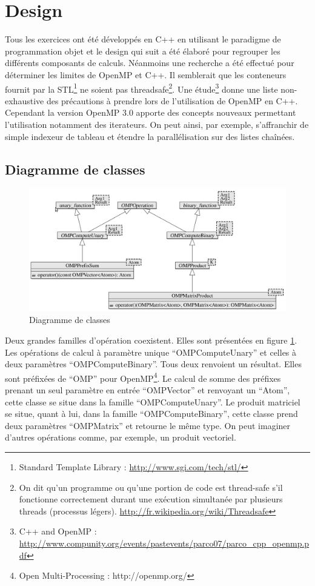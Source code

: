 \section{Design}

Tous les exercices ont été développés en C++ en utilisant le paradigme de programmation objet et le design qui suit a été élaboré pour regrouper les différents composants de calculs. Néanmoins une recherche a été effectué pour déterminer les limites de OpenMP et C++. Il semblerait que les conteneurs fournit par la STL\footnote{Standard Template Library : \url{http://www.sgi.com/tech/stl/}} ne soient pas threadsafe\footnote{On dit qu’un programme ou qu'une portion de code est thread-safe s'il fonctionne correctement durant une exécution simultanée par plusieurs threads (processus légers). \url{http://fr.wikipedia.org/wiki/Threadsafe}}. Une étude\footnote{C++ and OpenMP : \url{http://www.compunity.org/events/pastevents/parco07/parco_cpp_openmp.pdf}} donne une liste non-exhaustive des précautions à prendre lors de l’utilisation de OpenMP en C++. Cependant la version OpenMP 3.0 apporte des concepts nouveaux permettant l’utilisation notamment des iterateurs. On peut ainsi, par exemple, s’affranchir de simple indexeur de tableau et étendre la parallélisation sur des listes chaînées.

\subsection{Diagramme de classes}

\begin{figure}[here]
\centering
\includegraphics[scale=0.45]{images/diagram}
\caption{Diagramme de classes}
\label{fig:diagram}
\end{figure}

Deux grandes familles d'opération coexistent. Elles sont présentées en figure \ref{fig:diagram}. Les opérations de calcul à paramètre unique ``OMPComputeUnary'' et celles à deux paramètres ``OMPComputeBinary''. Tous deux renvoient un résultat. Elles sont préfixées de ``OMP'' pour OpenMP\footnote{Open Multi-Processing : http://openmp.org/}. Le calcul de somme des préfixes prenant un seul paramètre en entrée ``OMPVector'' et renvoyant un ``Atom'', cette classe se situe dans la famille ``OMPComputeUnary''. Le produit matriciel se situe, quant à lui, dans la famille “OMPComputeBinary”, cette classe prend deux paramètres ``OMPMatrix'' et retourne le même type. On peut imaginer d'autres opérations comme, par exemple, un produit vectoriel.

